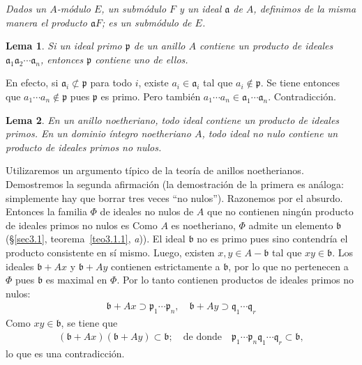 \documentclass[bibtotoc,leqno,spanish]{amsbook}
\let\emph\relax %
\newcommand{\idl}[1]{\mathfrak{#1}}
\numberwithin{equation}{section}
\newenvironment{comm}%
	{\begin{list}{}{\setlength{\leftmargin}{2\parindent}\setlength{\topsep}{\baselineskip}}\item\itshape}
	{\end{list}}
\theoremstyle{note}
\theoremstyle{note}
\newtheorem{lemma}{Lema}
\theoremstyle{rem}
\numberwithin{theorem}{section}
\numberwithin{proposition}{section}
\numberwithin{definition}{section}
\numberwithin{lemma}{section}
\numberwithin{corollary}{section}
\numberwithin{example}{section}
\numberwithin{footnote}{section}%
\begin{document}
\begin{comm}
Dados un $A$-m\'odulo $E$, un subm\'odulo $F$ y un ideal $\idl{a}$ de $A$, definimos
de la misma manera el producto $\idl{a}F$; es un subm\'odulo de $E$.
\end{comm}

\begin{lemma}\label{lem3.3.2}
Si un ideal primo $\idl{p}$ de un anillo $A$ contiene un producto de ideales
$\idl{a}_{1}\idl{a}_{2}\cdots\idl{a}_{n}$, entonces $\idl{p}$ contiene uno de ellos.
\end{lemma}

En efecto, si $\idl{a}_{i}\not\subset\idl{p}$ para todo $i$, existe $a_{i}\in\idl{a}_{i}$ tal que
$a_{i}\notin\idl{p}$. Se tiene entonces que $a_{1}\cdots a_{n}\notin\idl{p}$ pues $\idl{p}$
es primo. Pero tambi\'en $a_{1}\cdots a_{n}\in\idl{a}_{1}\cdots\idl{a}_{n}$. Contradicci\'on.

\begin{lemma}\label{lem3.3.3}
En un anillo noetheriano, todo ideal contiene un producto de ideales primos. En un dominio \'integro noetheriano
$A$, todo ideal no nulo contiene un producto de ideales primos no nulos.
\end{lemma}

Utilizaremos un argumento t\'ipico de la teor\'ia de anillos noetherianos. Demostremos la segunda
afirmaci\'on (la demostraci\'on de la primera es an\'aloga: simplemente hay que borrar tres
veces ``no nulos''). Razonemos por el absurdo. Entonces la familia $\Phi$ de ideales no nulos de $A$ que
no contienen ning\'un producto de ideales primos no nulos es \emph{no vac\'ia.} Como $A$ es noetheriano,
$\Phi$ admite un elemento \emph{maximal} $\idl{b}$ (\S\ref{sec3.1}, teorema~\ref{teo3.1.1}, {\itshape a})).
El ideal $\idl{b}$ no es primo pues
sino contendr\'ia el producto consistente en s\'i mismo. Luego, existen $x, y\in A-\idl{b}$ tal que
$xy\in\idl{b}$. Los ideales $\idl{b}+Ax$ y $\idl{b}+Ay$ contienen estrictamente a $\idl{b}$, por lo que
no pertenecen a $\Phi$ pues $\idl{b}$ es maximal en $\Phi$. Por lo tanto contienen productos de ideales
primos no nulos:
\begin{gather*}
\idl{b}+Ax\supset\idl{p}_{1}\cdots\idl{p}_{n},\quad\idl{b}+Ay\supset\idl{q}_{1}\cdots\idl{q}_{r}
\end{gather*}
Como $xy\in\idl{b}$, se tiene que
\begin{gather*}
(\idl{b}+Ax)(\idl{b}+Ay)\subset\idl{b};\quad\text{de donde}\quad\idl{p}_{1}\cdots\idl{p}_{n}\idl{q}_{1}\cdots
\idl{q}_{r}\subset\idl{b},
\end{gather*}
lo que es una contradicci\'on.
\end{document}
